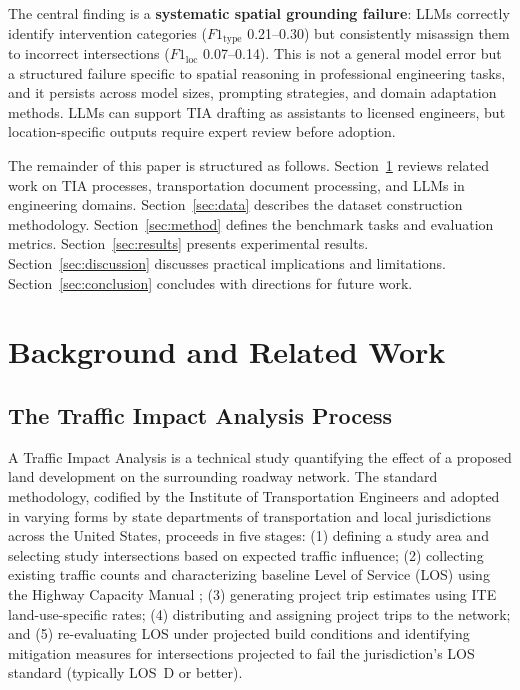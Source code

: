 \documentclass[preprint,12pt]{elsarticle}
\begin{document}
The central finding is a \textbf{systematic spatial grounding failure}:
LLMs correctly identify intervention categories ($F1_\text{type}$ 0.21--0.30)
but consistently misassign them to incorrect intersections
($F1_\text{loc}$ 0.07--0.14).
This is not a general model error but a structured failure specific to spatial
reasoning in professional engineering tasks, and it persists across model sizes,
prompting strategies, and domain adaptation methods.
LLMs can support TIA drafting as assistants to licensed engineers, but
location-specific outputs require expert review before adoption.

The remainder of this paper is structured as follows.
Section~\ref{sec:background} reviews related work on TIA processes,
transportation document processing, and LLMs in engineering domains.
Section~\ref{sec:data} describes the dataset construction methodology.
Section~\ref{sec:method} defines the benchmark tasks and evaluation metrics.
Section~\ref{sec:results} presents experimental results.
Section~\ref{sec:discussion} discusses practical implications and limitations.
Section~\ref{sec:conclusion} concludes with directions for future work.

\section{Background and Related Work}
\label{sec:background}

\subsection{The Traffic Impact Analysis Process}

A Traffic Impact Analysis is a technical study quantifying the effect of a
proposed land development on the surrounding roadway network.
The standard methodology, codified by the Institute of Transportation Engineers
\citep{ITE2021} and adopted in varying forms by state departments of
transportation and local jurisdictions across the United States, proceeds in
five stages: (1) defining a study area and selecting study intersections based on
expected traffic influence; (2) collecting existing traffic counts and
characterizing baseline Level of Service (LOS) using the Highway Capacity Manual
\citep{HCM2022}; (3) generating project trip estimates using ITE
land-use-specific rates; (4) distributing and assigning project trips to the
network; and (5) re-evaluating LOS under projected build conditions and
identifying mitigation measures for intersections projected to fail the
jurisdiction's LOS standard (typically LOS~D or better).
\end{document}
